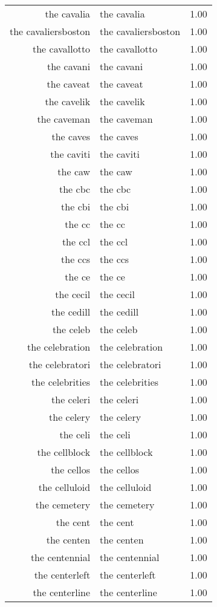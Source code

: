 \begin{table}[ht]
\begin{tabular}{rlr}
  the cavalia & the cavalia & 1.00 \\ 
  the cavaliersboston & the cavaliersboston & 1.00 \\ 
  the cavallotto & the cavallotto & 1.00 \\ 
  the cavani & the cavani & 1.00 \\ 
  the caveat & the caveat & 1.00 \\ 
  the cavelik & the cavelik & 1.00 \\ 
  the caveman & the caveman & 1.00 \\ 
  the caves & the caves & 1.00 \\ 
  the caviti & the caviti & 1.00 \\ 
  the caw & the caw & 1.00 \\ 
  the cbc & the cbc & 1.00 \\ 
  the cbi & the cbi & 1.00 \\ 
  the cc & the cc & 1.00 \\ 
  the ccl & the ccl & 1.00 \\ 
  the ccs & the ccs & 1.00 \\ 
  the ce & the ce & 1.00 \\ 
  the cecil & the cecil & 1.00 \\ 
  the cedill & the cedill & 1.00 \\ 
  the celeb & the celeb & 1.00 \\ 
  the celebration & the celebration & 1.00 \\ 
  the celebratori & the celebratori & 1.00 \\ 
  the celebrities & the celebrities & 1.00 \\ 
  the celeri & the celeri & 1.00 \\ 
  the celery & the celery & 1.00 \\ 
  the celi & the celi & 1.00 \\ 
  the cellblock & the cellblock & 1.00 \\ 
  the cellos & the cellos & 1.00 \\ 
  the celluloid & the celluloid & 1.00 \\ 
  the cemetery & the cemetery & 1.00 \\ 
  the cent & the cent & 1.00 \\ 
  the centen & the centen & 1.00 \\ 
  the centennial & the centennial & 1.00 \\ 
  the centerleft & the centerleft & 1.00 \\ 
  the centerline & the centerline & 1.00 \\ 

\end{tabular}
\end{table}
